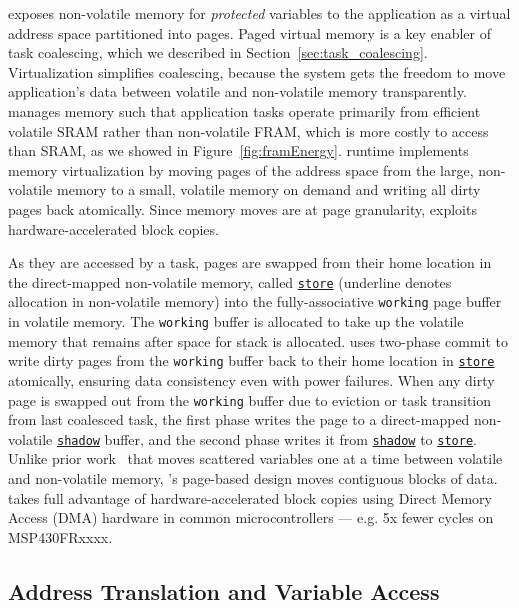 \sys exposes non-volatile memory for \emph{protected} variables to
the application as a virtual address space partitioned into pages.
Paged virtual memory is a key enabler of task coalescing, which
we described in Section~\ref{sec:task_coalescing}. Virtualization simplifies
coalescing, because the system gets the freedom to move application's data
between volatile and non-volatile memory transparently.
%
\sys manages memory such that application tasks operate primarily from
efficient volatile SRAM rather than non-volatile FRAM, which is more costly to access than SRAM,
as we showed in Figure~\ref{fig:framEnergy}. \sys runtime implements memory
virtualization by moving pages of the address space from the large,
non-volatile memory to a small, volatile memory on demand and writing all dirty
pages back atomically. Since memory moves are at page granularity, \sys
exploits hardware\hyp{}accelerated block copies.


As they are
accessed by a task, pages are swapped from their home location
in the direct\hyp{}mapped non-volatile memory, called
\texttt{\underline{store}} (underline denotes allocation in non-volatile
memory) into the fully\hyp{}associative \texttt{working} page buffer in volatile memory. The
\texttt{working} buffer is allocated to take up the volatile memory that
remains after space for stack is allocated.
%
\sys uses two-phase commit to write dirty pages from the \texttt{working} buffer
back to their home location in \texttt{\underline{store}} atomically,
ensuring data consistency even with power failures.
%
When any dirty page is swapped out from the \texttt{working} buffer due to
eviction or task transition from last coalesced task, the first phase writes
the page to a direct\hyp{}mapped non-volatile \texttt{\underline{shadow}}
buffer, and the second phase writes it from
\texttt{\underline{shadow}} to \texttt{\underline{store}}.
%
Unlike prior work~\cite{chain,alpaca} that moves scattered variables one at a
time between volatile and non-volatile memory, \sys's page-based
design moves contiguous blocks of data.
%
\sys takes full advantage of hardware\hyp{}accelerated block copies using
Direct Memory Access (DMA) hardware in common microcontrollers --- e.g. 5x
fewer cycles on MSP430FRxxxx.

\subsection{Address Translation and Variable Access}

